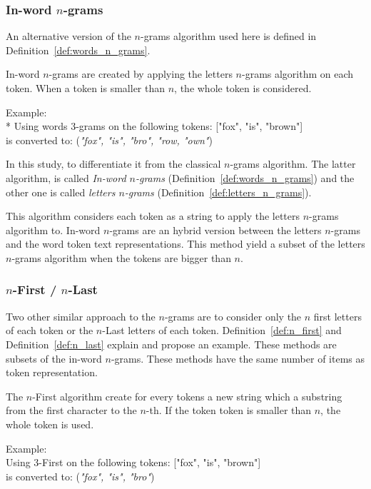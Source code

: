 \subsubsection{In-word $n$-grams}

An alternative version of the $n$-grams algorithm used here is defined in Definition~\ref{def:words_n_grams}.

\begin{definition}
  In-word $n$-grams are created by applying the letters $n$-grams algorithm on each token.
  When a token is smaller than $n$, the whole token is considered.

  Example: \\*
  Using words 3-grams on the following tokens: ["fox", "is", "brown"] \\
  is converted to: (\textit{"fox", "is", "bro", "row, "own"})
\end{definition}

In this study, to differentiate it from the classical $n$-grams algorithm.
The latter algorithm, is called \textit{In-word $n$-grams} (Definition~\ref{def:words_n_grams}) and the other one is called \textit{letters $n$-grams} (Definition~\ref{def:letters_n_grams}).

This algorithm considers each token as a string to apply the letters $n$-grams algorithm to.
In-word $n$-grams are an hybrid version between the letters $n$-grams and the word token text representations.
This method yield a subset of the letters $n$-grams algorithm when the tokens are bigger than $n$.

\subsubsection{$n$-First / $n$-Last}

Two other similar approach to the $n$-grams are to consider only the $n$ first letters of each token or the $n$-Last letters of each token.
Definition~\ref{def:n_first} and Definition~\ref{def:n_last} explain and propose an example.
These methods are subsets of the in-word $n$-grams.
These methods have the same number of items as token representation.

\begin{definition}
  The $n$-First algorithm create for every tokens a new string which a substring from the first character to the $n$-th.
  If the token token is smaller than $n$, the whole token is used.

  Example: \\
  Using $3$-First on the following tokens: ["fox", "is", "brown"] \\
  is converted to: (\textit{"fox", "is", "bro"})
\end{definition}

